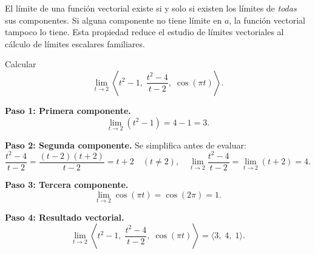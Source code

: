 \begin{rem}
El límite de una función vectorial existe si y solo si existen los
límites de \emph{todas} sus componentes. Si alguna componente no tiene
límite en $a$, la función vectorial tampoco lo tiene. Esta propiedad
reduce el estudio de límites vectoriales al cálculo de límites escalares
familiares.
\end{rem}

\begin{example}
Calcular
\[
\lim_{t \to 2} \left\langle t^2 - 1,\; \frac{t^2 - 4}{t - 2},\; \cos(\pi t) \right\rangle.
\]
\begin{myproof}
\textbf{Paso 1: Primera componente.}
\[
\lim_{t \to 2} (t^2 - 1) = 4 - 1 = 3.
\]

\textbf{Paso 2: Segunda componente.} Se simplifica antes de evaluar:
\[
\frac{t^2 - 4}{t - 2} = \frac{(t-2)(t+2)}{t-2} = t+2 \quad (t \neq 2),\quad
\lim_{t \to 2} \frac{t^2 - 4}{t - 2} = \lim_{t \to 2} (t+2) = 4.
\]

\textbf{Paso 3: Tercera componente.}
\[
\lim_{t \to 2} \cos(\pi t) = \cos(2\pi) = 1.
\]

\textbf{Paso 4: Resultado vectorial.}
\[
\boxed{\lim_{t \to 2} \left\langle t^2 - 1,\; \frac{t^2 - 4}{t - 2},\; \cos(\pi t) \right\rangle = \langle 3,\; 4,\; 1 \rangle}.
\]
\end{myproof}
\end{example}

